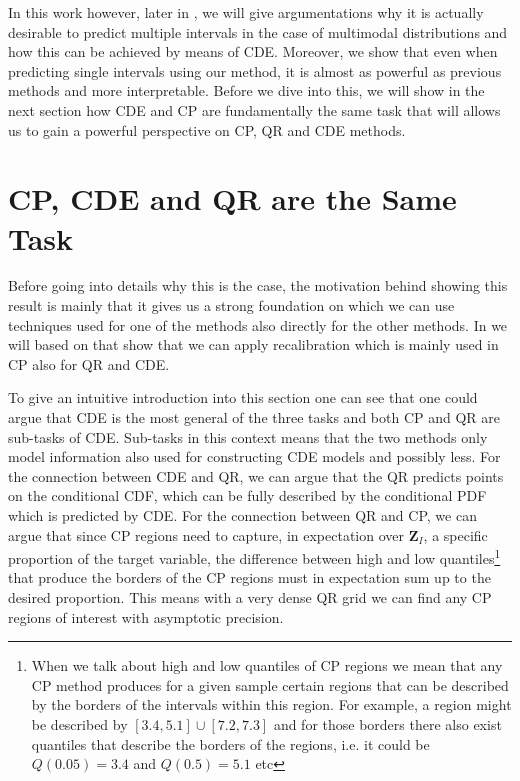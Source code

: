 In this work however, later in , we will give argumentations why it is actually desirable to predict multiple intervals in the case of multimodal distributions and how this can be achieved by means of CDE. Moreover, we show that even when predicting single intervals using our method, it is almost as powerful as previous methods and more interpretable. Before we dive into this, we will show in the next section how CDE and CP are fundamentally the same task that will allows us to gain a powerful perspective on CP, QR and CDE methods.

\section{CP, CDE and QR are the Same Task}\label{sec:cp_sub_cde}

Before going into details why this is the case, the motivation behind showing this result is mainly that it gives us a strong foundation on which we can use techniques used for one of the methods also directly for the other methods. In  we will based on that show that we can apply recalibration which is mainly used in CP also for QR and CDE.

To give an intuitive introduction into this section one can see that one could argue that CDE is the most general of the three tasks and both CP and QR are sub-tasks of CDE. Sub-tasks in this context means that the two methods only model information also used for constructing CDE models and possibly less. For the connection between CDE and QR, we can argue that the QR predicts points on the conditional CDF, which can be fully described by the conditional PDF which is predicted by CDE. For the connection between QR and CP, we can argue that since CP regions need to capture, in expectation over $\mathbf{Z}_I$, a specific proportion of the target variable, the difference between high and low quantiles\footnote{When we talk about high and low quantiles of CP regions we mean that any CP method produces for a given sample certain regions that can be described by the borders of the intervals within this region. For example, a region might be described by $[3.4, 5.1] \cup [7.2, 7.3]$ and for those borders there also exist quantiles that describe the borders of the regions, i.e. it could be $Q(0.05) = 3.4$ and $Q(0.5) = 5.1$ etc} that produce the borders of the CP regions must in expectation sum up to the desired proportion. This means with a very dense QR grid we can find any CP regions of interest with asymptotic precision.

